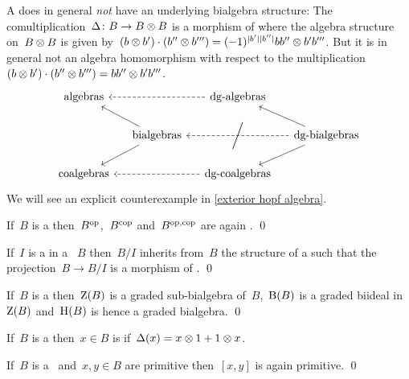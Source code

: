 \documentclass[a4paper,10pt,headings=standardclasses]{scrartcl}
\begin{document}
\begin{warning}
  A {\dgb} does in general \emph{not} have an underlying bialgebra structure:
  The comultiplication~$\Delta \colon B \to B \otimes B$ is a morphism of {\dgas} where the algebra structure on~$B \otimes B$ is given by~$(b \otimes b') \cdot (b'' \otimes b''') = (-1)^{\lvert b'\rvert \lvert b''\rvert} b b'' \otimes b' b'''$.
  But it is in general not an algebra homomorphism with respect to the multiplication~$(b \otimes b') \cdot (b'' \otimes b''') = b b'' \otimes b' b'''$.
  \[
    \begin{tikzcd}[column sep = small]
      \text{algebras}
      &
      {}
      &
      \text{\dgas}
      \arrow[dashed]{ll}
      &
      {}
      \\
      {}
      &
      \text{bialgebras}
      \arrow{ul}
      \arrow{dl}
      &
      {}
      &
      \text{\dgbs}
      \arrow{ul}
      \arrow[dashed]{ll}[{anchor=center,sloped}]{\bigg/}
      \arrow{dl}
      \\
      \text{coalgebras}
      &
      {}
      &
      \text{\dgcs}
      \arrow[dashed]{ll}
      &
      {}
    \end{tikzcd}
  \]
  We will see an explicit counterexample in \cref{exterior hopf algebra}.
\end{warning}

\begin{lemma}
  If~$B$ is a {\dgb} then~$B^{\mathrm{op}}$,~$B^{\mathrm{cop}}$ and~$B^{\mathrm{op},\mathrm{cop}}$ are again {\dgbs}.
  \qed
\end{lemma}

\begin{lemma}
  If~$I$ is a {\dgbi} in a {\dgb}~$B$ then~$B/I$ inherits from~$B$ the structure of a {\dgb} such that the projection~$B \to B/I$ is a morphism of {\dgb}.
  \qed
\end{lemma}

\begin{proposition}
  If~$B$ is a {\dgb} then~$\operatorname{Z}(B)$ is a graded sub-bialgebra of~$B$,~$\operatorname{B}(B)$ is a graded biideal in~$\operatorname{Z}(B)$ and~$\operatorname{H}(B)$ is hence a graded bialgebra.
  \qed
\end{proposition}

\begin{definition}
  If~$B$ is a {\dgb} then~$x \in B$ is  if~$\Delta(x) = x \otimes 1 + 1 \otimes x$.
\end{definition}

\begin{lemma}
  If~$B$ is a~{\dgb} and~$x, y \in B$ are primitive then~$[x,y]$ is again primitive.
  \qed
\end{lemma}
\end{document}

